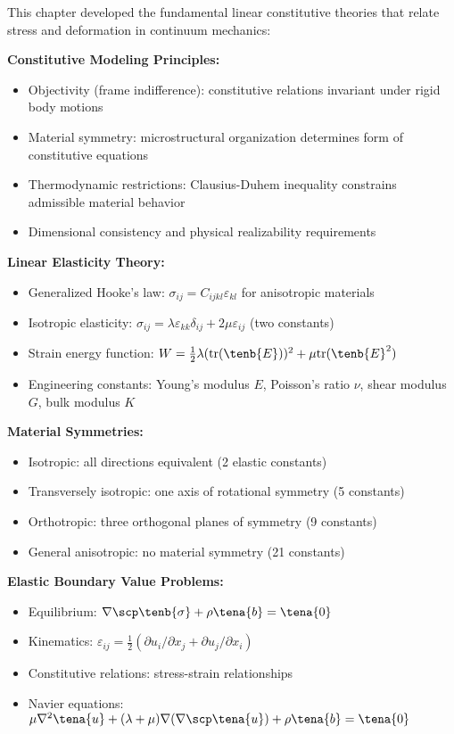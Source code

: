 \begin{subox}[Summary]
This chapter developed the fundamental linear constitutive theories that relate stress and deformation in continuum mechanics:

\textbf{Constitutive Modeling Principles:}
\begin{itemize}
\item Objectivity (frame indifference): constitutive relations invariant under rigid body motions
\item Material symmetry: microstructural organization determines form of constitutive equations
\item Thermodynamic restrictions: Clausius-Duhem inequality constrains admissible material behavior
\item Dimensional consistency and physical realizability requirements
\end{itemize}

\textbf{Linear Elasticity Theory:}
\begin{itemize}
\item Generalized Hooke's law: $\sigma_{ij} = C_{ijkl} \varepsilon_{kl}$ for anisotropic materials
\item Isotropic elasticity: $\sigma_{ij} = \lambda \varepsilon_{kk} \delta_{ij} + 2\mu \varepsilon_{ij}$ (two constants)
\item Strain energy function: $W = \frac{1}{2}\lambda(\text{tr}(\tenb{E}))^2 + \mu \text{tr}(\tenb{E}^2)$
\item Engineering constants: Young's modulus $E$, Poisson's ratio $\nu$, shear modulus $G$, bulk modulus $K$
\end{itemize}

\textbf{Material Symmetries:}
\begin{itemize}
\item Isotropic: all directions equivalent (2 elastic constants)
\item Transversely isotropic: one axis of rotational symmetry (5 constants)
\item Orthotropic: three orthogonal planes of symmetry (9 constants)
\item General anisotropic: no material symmetry (21 constants)
\end{itemize}

\textbf{Elastic Boundary Value Problems:}
\begin{itemize}
\item Equilibrium: $\nabla \scp \tenb{\sigma} + \rho \tena{b} = \tena{0}$
\item Kinematics: $\varepsilon_{ij} = \frac{1}{2}(\partial u_i/\partial x_j + \partial u_j/\partial x_i)$
\item Constitutive relations: stress-strain relationships
\item Navier equations: $\mu \nabla^2 \tena{u} + (\lambda + \mu) \nabla(\nabla \scp \tena{u}) + \rho \tena{b} = \tena{0}$
\end{itemize}


\end{subox}
